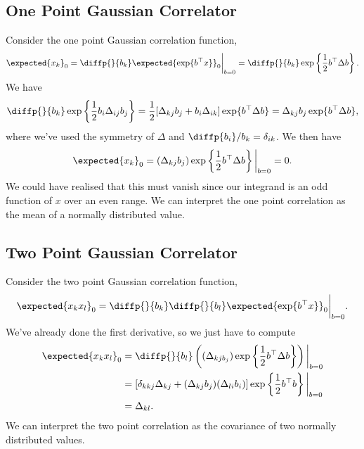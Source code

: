 \documentclass[fleqn]{NotesClass}
\newcommand{\trans}{{\top}}
\begin{document}
    \subsection{One Point Gaussian Correlator}
    Consider the one point Gaussian correlation function,
    \begin{equation}
        \expected{x_k}_0 = \diffp{}{b_k} \expected{\exp\{b^\trans x\}}_0 \bigg|_{b = 0} = \diffp{}{b_k} \exp\left\{ \frac{1}{2}b^\trans \Delta b \right\}.
    \end{equation}
    We have
    \begin{equation}
        \diffp{}{b_k} \exp\left\{ \frac{1}{2}b_i\Delta_{ij}b_j \right\} = \frac{1}{2}[\Delta_{kj}b_j + b_i\Delta_{ik}]\exp\{b^\trans \Delta b\} = \Delta_{kj}b_j \exp\{b^\trans \Delta b\},
    \end{equation}
    where we've used the symmetry of \(\Delta\) and \(\diffp{b_i}/{b_k} = \delta_{ik}\).
    We then have
    \begin{equation}
        \expected{x_k}_0 = (\Delta_{kj}b_j) \exp\left\{ \frac{1}{2}b^\trans \Delta b \right\}\bigg|_{b = 0} = 0.
    \end{equation}
    We could have realised that this must vanish since our integrand is an odd function of \(x\) over an even range.
    We can interpret the one point correlation as the mean of a normally distributed value.
    
    \subsection{Two Point Gaussian Correlator}
    Consider the two point Gaussian correlation function,
    \begin{equation}
        \expected{x_kx_l}_{0} = \diffp{}{b_k}\diffp{}{b_l} \expected{\exp\{b^\trans x\}}_0 \bigg|_{b = 0}.
    \end{equation}
    We've already done the first derivative, so we just have to compute
    \begin{align}
        \expected{x_kx_l}_0 &= \diffp{}{b_l} \left( (\Delta_{kj b_j})\exp\left\{ \frac{1}{2}b^\trans \Delta b \right\} \right)\bigg|_{b = 0}\\
        &= [\delta_{kkj}\Delta_{kj} + (\Delta_{kj}b_j)(\Delta_{li}b_i)] \exp\left\{ \frac{1}{2}b^\trans b \right\}\bigg|_{b = 0}\\
        &= \Delta_{kl}.
    \end{align}
    We can interpret the two point correlation as the covariance of two normally distributed values.
    
\end{document}
